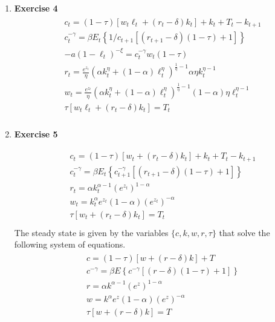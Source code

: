 \documentclass[12pt, letterpaper,bibtotoc, tablecaptionabove, figurecaptionabove]{article}
\begin{document}
\begin{enumerate}
\item{\bf{Exercise 4}}
\begin{eqnarray*}
\begin{aligned}
&c_{t}=(1-\tau)\left[w_{t} \ell_{t}+\left(r_{t}-\delta\right) k_{t}\right]+k_{t}+T_{t}-k_{t+1}\\
&c_t^{-\gamma}=\beta E_{t}\left\{1/c_{t+1}\left[\left(r_{t+1}-\delta\right)(1-\tau)+1\right]\right\}\\
&-a(1-\ell_t)^{-\xi}=c_t^{-\gamma} w_{t}(1-\tau)\\
&r_t=\frac{e^{z_t}}{\eta}(\alpha k_t^\eta+(1-\alpha)\ell_t^\eta)^{\frac{1}{\eta}-1}\alpha\eta k_t^{\eta-1} \\
& w_t=\frac{e^{z_t}}{\eta}(\alpha k_t^\eta+(1-\alpha)\ell_t^\eta)^{\frac{1}{\eta}-1}(1-\alpha)\eta \ell_t^{\eta-1} \\ 
&{\tau\left[w_{t} \ell_{t}+\left(r_{t}-\delta\right) k_{t}\right]=T_{t}} \\ 
\end{aligned}
\end{eqnarray*}

\item{\bf{Exercise 5}}

\begin{eqnarray*}
\begin{aligned}
&c_{t}=(1-\tau)\left[w_{t}+\left(r_{t}-\delta\right) k_{t}\right]+k_{t}+T_{t}-k_{t+1}\\
&c_t^{-\gamma}=\beta E_{t}\left\{c_{t+1}^{-\gamma}\left[\left(r_{t+1}-\delta\right)(1-\tau)+1\right]\right\}\\
&r_t=\alpha k_t^{\alpha-1}(e^{z_t})^{1-\alpha} \\
& w_t=k_t^\alpha e^{z_t}(1-\alpha)(e^{z_t})^{-\alpha}\\ 
&{\tau\left[w_{t} +\left(r_{t}-\delta\right) k_{t}\right]=T_{t}} \\ 
\end{aligned}
\end{eqnarray*}
The steady state is given by the variables $\{c,k,w,r,\tau\}$ that solve the following system of equations.
\begin{eqnarray*}
\begin{aligned}
&c=(1-\tau)\left[w+\left(r-\delta\right) k\right]+T\\
&c^{-\gamma}=\beta E\left\{c^{-\gamma}\left[\left(r-\delta\right)(1-\tau)+1\right]\right\}\\
&r=\alpha k^{\alpha-1}(e^{z})^{1-\alpha} \\
 &w=k^\alpha e^{z}(1-\alpha)(e^{z})^{-\alpha}\\ 
&{\tau\left[w+\left(r-\delta\right) k\right]=T} \\ 
\end{aligned}
\end{eqnarray*}


\end{enumerate}
\end{document}
